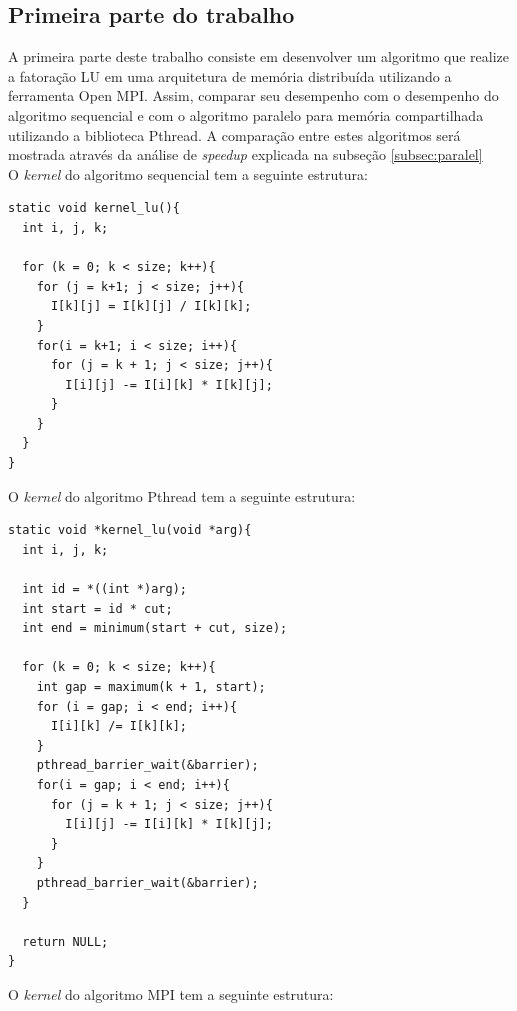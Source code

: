 \documentclass[12pt]{article}
\newcommand\tab[1][1cm]{\hspace*{#1}}
\begin{document}
\subsection{Primeira parte do trabalho}\label{subsec:prop1}
\tab A primeira parte deste trabalho consiste em desenvolver um algoritmo que realize a fatoração LU em uma arquitetura de memória distribuída utilizando a ferramenta Open MPI. Assim, comparar seu desempenho com o desempenho do algoritmo sequencial e  com o algoritmo paralelo para memória compartilhada utilizando a biblioteca Pthread.
\tab A comparação entre estes algoritmos será mostrada através da análise de \textit{speedup} explicada na subseção \ref{subsec:paralel}
\\
\tab O \textit{kernel} do algoritmo sequencial tem a seguinte estrutura: 
\begin{lstlisting}[style=CStyle]
static void kernel_lu(){
  int i, j, k;

  for (k = 0; k < size; k++){
    for (j = k+1; j < size; j++){
      I[k][j] = I[k][j] / I[k][k];
    }
    for(i = k+1; i < size; i++){
      for (j = k + 1; j < size; j++){
        I[i][j] -= I[i][k] * I[k][j];
      }
    }   
  }
}
\end{lstlisting}
\tab O \textit{kernel} do algoritmo Pthread tem a seguinte estrutura: 
\begin{lstlisting}[style=CStyle]
static void *kernel_lu(void *arg){
  int i, j, k;

  int id = *((int *)arg);
  int start = id * cut;
  int end = minimum(start + cut, size);

  for (k = 0; k < size; k++){
    int gap = maximum(k + 1, start);
    for (i = gap; i < end; i++){
      I[i][k] /= I[k][k];
    }
    pthread_barrier_wait(&barrier);
    for(i = gap; i < end; i++){
      for (j = k + 1; j < size; j++){
        I[i][j] -= I[i][k] * I[k][j];
      }
    }
    pthread_barrier_wait(&barrier);
  }

  return NULL;
}
\end{lstlisting}
\tab O \textit{kernel} do algoritmo MPI tem a seguinte estrutura: 
\end{document}

